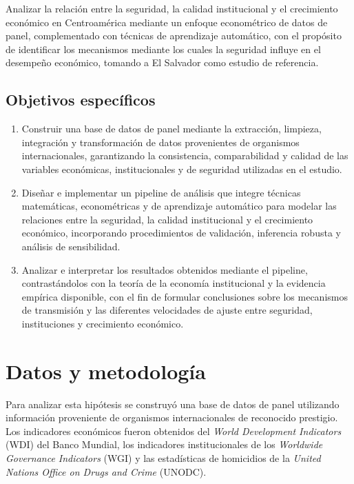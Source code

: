 \documentclass[11pt,a4paper]{article}
\begin{document}
Analizar la relación entre la seguridad, la calidad institucional y el crecimiento económico en Centroamérica mediante un enfoque econométrico de datos de panel, complementado con técnicas de aprendizaje automático, con el propósito de identificar los mecanismos mediante los cuales la seguridad influye en el desempeño económico, tomando a El Salvador como estudio de referencia.
\subsection*{Objetivos específicos}

\begin{enumerate}
    \item Construir una base de datos de panel mediante la extracción, limpieza, integración y transformación de datos provenientes de organismos internacionales, garantizando la consistencia, comparabilidad y calidad de las variables económicas, institucionales y de seguridad utilizadas en el estudio.

    \item Diseñar e implementar un pipeline de análisis que integre técnicas matemáticas, econométricas y de aprendizaje automático para modelar las relaciones entre la seguridad, la calidad institucional y el crecimiento económico, incorporando procedimientos de validación, inferencia robusta y análisis de sensibilidad.

    \item Analizar e interpretar los resultados obtenidos mediante el pipeline, contrastándolos con la teoría de la economía institucional y la evidencia empírica disponible, con el fin de formular conclusiones sobre los mecanismos de transmisión y las diferentes velocidades de ajuste entre seguridad, instituciones y crecimiento económico.
\end{enumerate}

\section{Datos y metodología}

Para analizar esta hipótesis se construyó una base de datos de panel utilizando información proveniente de organismos internacionales de reconocido prestigio. Los indicadores económicos fueron obtenidos del \textit{World Development Indicators} (WDI) del Banco Mundial, los indicadores institucionales de los \textit{Worldwide Governance Indicators} (WGI) y las estadísticas de homicidios de la \textit{United Nations Office on Drugs and Crime} (UNODC).
\end{document}
